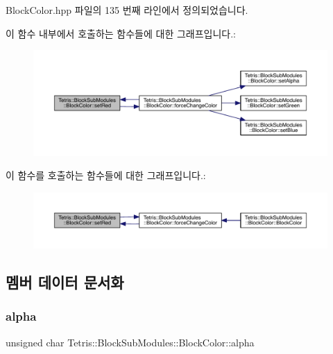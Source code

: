 Block\+Color.\+hpp 파일의 135 번째 라인에서 정의되었습니다.

이 함수 내부에서 호출하는 함수들에 대한 그래프입니다.\+:
\nopagebreak
\begin{figure}[H]
\begin{center}
\leavevmode
\includegraphics[width=350pt]{class_tetris_1_1_block_sub_modules_1_1_block_color_a9541e6b5b809214ae2691a99af06ac3f_cgraph}
\end{center}
\end{figure}
이 함수를 호출하는 함수들에 대한 그래프입니다.\+:
\nopagebreak
\begin{figure}[H]
\begin{center}
\leavevmode
\includegraphics[width=350pt]{class_tetris_1_1_block_sub_modules_1_1_block_color_a9541e6b5b809214ae2691a99af06ac3f_icgraph}
\end{center}
\end{figure}


\subsection{멤버 데이터 문서화}
\mbox{\label{class_tetris_1_1_block_sub_modules_1_1_block_color_af0983ea684f33617a0b482cfea1d3c2b}} 
\subsubsection{\texorpdfstring{alpha}{alpha}}
{\footnotesize\ttfamily unsigned char Tetris\+::\+Block\+Sub\+Modules\+::\+Block\+Color\+::alpha\hspace{0.3cm}{\ttfamily [protected]}}



